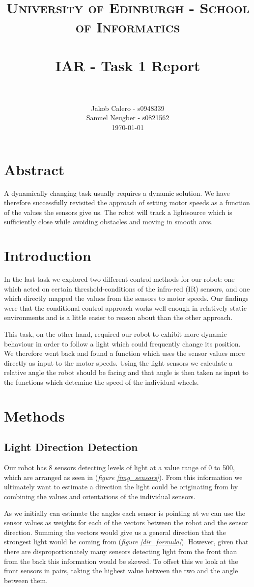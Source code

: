\documentclass[paper=a4, fontsize=12pt]{scrartcl}	%
\title{
\vspace{-1in} 	
\usefont{OT1}{bch}{b}{n}
\normalfont \normalsize \textsc{University of Edinburgh - School of Informatics}
\\ [25pt]
\horrule{0.5pt} \\[0.4cm]
\large IAR - Task 1 Report \\
\horrule{1pt} \\[0.5cm]
}
\author{
  \normalfont \normalsize
  Jakob Calero - s0948339\\[-3pt]\normalsize
  Samuel Neugber - s0821562\\[-3pt]\normalsize
  \today
}
\date{}
\numberwithin{equation}{section}		%
\numberwithin{figure}{section}			%
\numberwithin{table}{section}				%
\begin{document}
\maketitle					%
\section{Abstract}
A dynamically changing task usually requires a dynamic solution. We have therefore successfully revisited the approach of setting motor speeds as a function of the values the sensors give us. The robot will track a lightsource which is sufficiently close while avoiding obstacles and moving in smooth arcs.


\section{Introduction}
In the last task we explored two different control methods for our robot: one which acted on certain threshold-conditions of the infra-red (IR) sensors, and one which directly mapped the values from the sensors to motor speeds. Our findings were that the conditional control approach works well enough in relatively static environments and is a little easier to reason about than the other approach.

This task, on the other hand, required our robot to exhibit more dynamic behaviour in order to follow a light which could frequently change its position. We therefore went back and found a function which uses the sensor values more directly as input to the motor speeds. Using the light sensors we calculate a relative angle the robot should be facing and that angle is then taken as input to the functions which detemine the speed of the individual wheels.

\section{Methods} 
\subsection{Light Direction Detection}
\label{LDD}
Our robot has 8 sensors detecting levels of light at a value range of 0 to 500, which are arranged as seen in (\emph{figure \ref{img_sensors}}). From this information we ultimately want to estimate a direction the light could be originating from by combining the values and orientations of the individual sensors.

As we initially can estimate the angles each sensor is pointing at we can use the sensor values as weights for each of the vectors between the robot and the sensor direction. Summing the vectors would give us a general direction that the strongest light would be coming from (\emph{figure \ref{dir_formula}}). However, given that there are disproportionately many sensors detecting light from the front than from the back this information would be skewed. To offset this we look at the front sensors in pairs, taking the highest value between the two and the angle between them.
\end{document}
